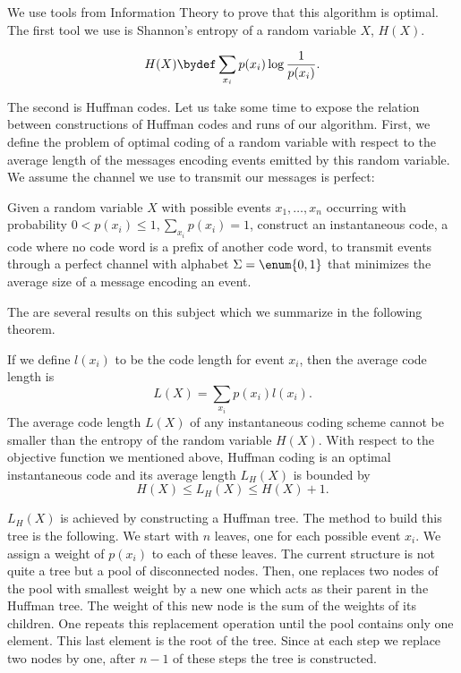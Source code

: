 We use tools from Information Theory to prove that this algorithm is
optimal. The first tool we use is Shannon's entropy of a random
variable \(X\), \(H(X)\).
\begin{definition}
\begin{displaymath}
H(X) \bydef \sum_{x_i} p(x_i) \log \frac{1}{p(x_i)}.
\end{displaymath}
\end{definition}
The second is Huffman codes.
Let us take some time to expose the relation between constructions of Huffman
codes and runs of our algorithm. First, we define the problem of optimal
coding of a random variable with respect to the average length of the messages
encoding events emitted by this random variable. We assume the channel we
use to transmit our messages is perfect:

\begin{problem}
Given a random variable \(X\) with possible events \(x_1,\ldots,x_n\) occurring
with probability \(0 < p(x_i) \le 1, \sum_{x_i} p(x_i) = 1\), construct an
instantaneous code, \ie a code where no code word is a prefix of another code
word, to transmit events through a perfect channel with alphabet
\(\Sigma = \enum{0,1}\) that minimizes the average size of a message encoding
an event.
\end{problem}

The are several results on this subject which we summarize in the
following theorem.

\begin{theorem}
If we define \(l(x_i)\) to be the code
length for event \(x_i\), then the average code length is
\begin{displaymath}
L(X) = \sum_{x_i} p(x_i) l(x_i).
\end{displaymath}
The average code length \(L(X)\) of any instantaneous coding scheme cannot be smaller than
the entropy of the random variable \(H(X)\).
With respect to the objective function we mentioned above, Huffman coding is
an optimal instantaneous code and its average length \(L_H(X)\) is bounded by
\begin{displaymath}
H(X) \le L_H(X) \le H(X) + 1.
\end{displaymath}
\end{theorem}

\(L_H(X)\) is achieved by constructing a Huffman tree. The method to build this
tree is the following. We start with \(n\) leaves, one for each possible event
\(x_i\). We assign a weight of \(p(x_i)\) to each of these leaves. The current
structure is not quite a tree but a pool of disconnected nodes. Then, one
replaces two nodes of the pool with smallest weight by a new one which
acts as their parent in the Huffman tree. The weight of this new node is
the sum of the weights of its children. One repeats this
replacement operation until the pool contains only one element. This last
element is the root of the tree. Since at each step we replace two nodes by
one, after \(n-1\) of these steps the tree is constructed.


